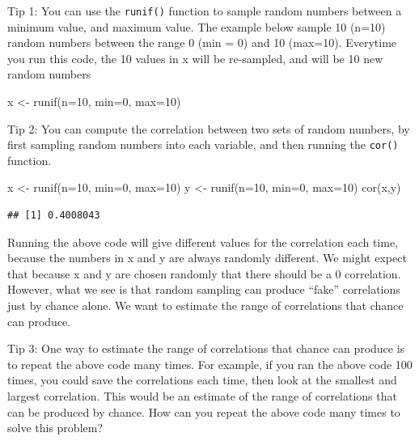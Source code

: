 \documentclass[
]{book}
\newenvironment{Shaded}{\begin{snugshade}}{\end{snugshade}}
\newcommand{\AttributeTok}[1]{\textcolor[rgb]{0.77,0.63,0.00}{#1}}
\newcommand{\DecValTok}[1]{\textcolor[rgb]{0.00,0.00,0.81}{#1}}
\newcommand{\FunctionTok}[1]{\textcolor[rgb]{0.00,0.00,0.00}{#1}}
\newcommand{\NormalTok}[1]{#1}
\newcommand{\OtherTok}[1]{\textcolor[rgb]{0.56,0.35,0.01}{#1}}
\begin{document}
Tip 1: You can use the \texttt{runif()} function to sample random numbers between a minimum value, and maximum value. The example below sample 10 (n=10) random numbers between the range 0 (min = 0) and 10 (max=10). Everytime you run this code, the 10 values in x will be re-sampled, and will be 10 new random numbers

\begin{Shaded}
\begin{Highlighting}[]
\NormalTok{x }\OtherTok{\textless{}{-}} \FunctionTok{runif}\NormalTok{(}\AttributeTok{n=}\DecValTok{10}\NormalTok{, }\AttributeTok{min=}\DecValTok{0}\NormalTok{, }\AttributeTok{max=}\DecValTok{10}\NormalTok{)}
\end{Highlighting}
\end{Shaded}

Tip 2: You can compute the correlation between two sets of random numbers, by first sampling random numbers into each variable, and then running the \texttt{cor()} function.

\begin{Shaded}
\begin{Highlighting}[]
\NormalTok{x }\OtherTok{\textless{}{-}} \FunctionTok{runif}\NormalTok{(}\AttributeTok{n=}\DecValTok{10}\NormalTok{, }\AttributeTok{min=}\DecValTok{0}\NormalTok{, }\AttributeTok{max=}\DecValTok{10}\NormalTok{)}
\NormalTok{y }\OtherTok{\textless{}{-}} \FunctionTok{runif}\NormalTok{(}\AttributeTok{n=}\DecValTok{10}\NormalTok{, }\AttributeTok{min=}\DecValTok{0}\NormalTok{, }\AttributeTok{max=}\DecValTok{10}\NormalTok{)}
\FunctionTok{cor}\NormalTok{(x,y)}
\end{Highlighting}
\end{Shaded}

\begin{verbatim}
## [1] 0.4008043
\end{verbatim}

Running the above code will give different values for the correlation each time, because the numbers in x and y are always randomly different. We might expect that because x and y are chosen randomly that there should be a 0 correlation. However, what we see is that random sampling can produce ``fake'' correlations just by chance alone. We want to estimate the range of correlations that chance can produce.

Tip 3: One way to estimate the range of correlations that chance can produce is to repeat the above code many times. For example, if you ran the above code 100 times, you could save the correlations each time, then look at the smallest and largest correlation. This would be an estimate of the range of correlations that can be produced by chance. How can you repeat the above code many times to solve this problem?
\end{document}
